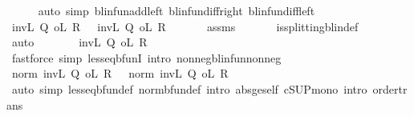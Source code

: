 \begin{isabellebody}
\ \ \ \ \isamarkupfalse%
\ {\isacharparenleft}{\kern0pt}auto\ simp{\isacharcolon}{\kern0pt}\ blinfun{\isachardot}{\kern0pt}add{\isacharunderscore}{\kern0pt}left\ blinfun{\isachardot}{\kern0pt}diff{\isacharunderscore}{\kern0pt}right\ blinfun{\isachardot}{\kern0pt}diff{\isacharunderscore}{\kern0pt}left{\isacharparenright}{\kern0pt}\isanewline
\ \ \isamarkupfalse%
\ {\isachardoublequoteopen}{\isacharparenleft}{\kern0pt}inv\isactrlsub L\ Q{}\ o\isactrlsub L\ R{}{\isacharparenright}{\kern0pt}\ {}\ {\isasymle}\ {\isacharparenleft}{\kern0pt}inv\isactrlsub L\ Q{}\ o\isactrlsub L\ R{}{\isacharparenright}{\kern0pt}\ {}{\isachardoublequoteclose}\isanewline
\ \ \ \ \isamarkupfalse%
\ assms\ \isanewline
\ \ \ \ \isamarkupfalse%
\ is{\isacharunderscore}{\kern0pt}splitting{\isacharunderscore}{\kern0pt}blin{\isacharunderscore}{\kern0pt}def{\isacharprime}{\kern0pt}\isanewline
\ \ \ \ \isamarkupfalse%
\ auto\isanewline
\ \ \isamarkupfalse%
\ \isamarkupfalse%
\ {\isachardoublequoteopen}{}\ {\isasymle}\ {\isacharparenleft}{\kern0pt}inv\isactrlsub L\ Q{}\ o\isactrlsub L\ R{}{\isacharparenright}{\kern0pt}\ {}{\isachardoublequoteclose}\isanewline
\ \ \ \ \isamarkupfalse%
\ {\isacharasterisk}{\kern0pt}\ \isanewline
\ \ \ \ \isamarkupfalse%
\ {\isacharparenleft}{\kern0pt}fastforce\ simp{\isacharcolon}{\kern0pt}\ less{\isacharunderscore}{\kern0pt}eq{\isacharunderscore}{\kern0pt}bfunI\ intro{\isacharbang}{\kern0pt}{\isacharcolon}{\kern0pt}\ nonneg{\isacharunderscore}{\kern0pt}blinfun{\isacharunderscore}{\kern0pt}nonneg{\isacharparenright}{\kern0pt}\isanewline
\ \ \isamarkupfalse%
\ \isamarkupfalse%
\ {\isachardoublequoteopen}norm\ {\isacharparenleft}{\kern0pt}{\isacharparenleft}{\kern0pt}inv\isactrlsub L\ Q{}\ o\isactrlsub L\ R{}{\isacharparenright}{\kern0pt}\ {}{\isacharparenright}{\kern0pt}\ {\isasymle}\ norm\ {\isacharparenleft}{\kern0pt}{\isacharparenleft}{\kern0pt}inv\isactrlsub L\ Q{}\ o\isactrlsub L\ R{}{\isacharparenright}{\kern0pt}\ {}{\isacharparenright}{\kern0pt}{\isachardoublequoteclose}\isanewline
\ \ \ \ \isamarkupfalse%
\ {\isacharparenleft}{\kern0pt}auto\ simp{\isacharcolon}{\kern0pt}\ less{\isacharunderscore}{\kern0pt}eq{\isacharunderscore}{\kern0pt}bfun{\isacharunderscore}{\kern0pt}def\ norm{\isacharunderscore}{\kern0pt}bfun{\isacharunderscore}{\kern0pt}def{\isacharprime}{\kern0pt}\ intro{\isacharbang}{\kern0pt}{\isacharcolon}{\kern0pt}\ abs{\isacharunderscore}{\kern0pt}ge{\isacharunderscore}{\kern0pt}self\ cSUP{\isacharunderscore}{\kern0pt}mono\ intro{\isacharcolon}{\kern0pt}\ order{\isachardot}{\kern0pt}trans{\isacharparenright}{\kern0pt}\isanewline

\end{isabellebody}
